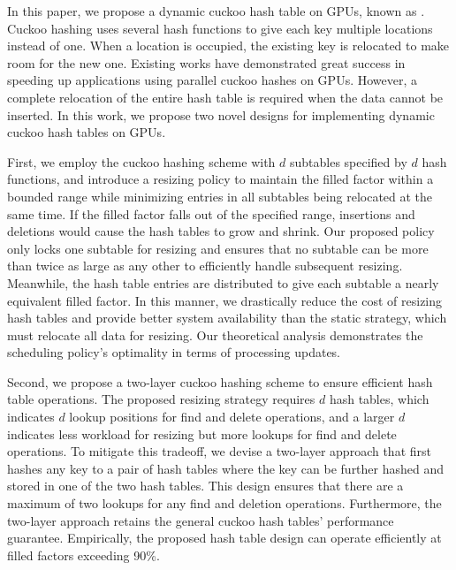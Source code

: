 In this paper, we propose a dynamic cuckoo hash table on GPUs, known as \voter. Cuckoo hashing \cite{pagh2004cuckoo} uses several hash functions to give each key multiple locations instead of one. When a location is occupied, the existing key is relocated to make room for the new one. Existing works \cite{alcantara2009real,alcantara2011building,zhang2015mega,breslow2016horton} have demonstrated great success in speeding up applications using parallel cuckoo hashes on GPUs. 
However, a complete relocation of the entire hash table is required when the data cannot be  inserted.
In this work, we propose two novel designs for implementing dynamic cuckoo hash tables on GPUs.

First, we employ the cuckoo hashing scheme with $d$ subtables specified by $d$ hash functions, and introduce a resizing policy to maintain the filled factor within a bounded range while minimizing entries in all subtables being relocated at the same time. 
If the filled factor falls out of the specified range, insertions and deletions would cause the hash tables to grow and shrink.
Our proposed policy only locks one subtable for resizing and ensures that no subtable can be more than twice as large as any other to efficiently handle subsequent resizing. Meanwhile, the hash table entries are distributed to give each subtable a nearly equivalent filled factor.
In this manner, we drastically reduce the cost of resizing hash tables and provide better system availability than the static strategy, which must relocate all data for resizing.
Our theoretical analysis demonstrates the scheduling policy's optimality in terms of processing updates. 

Second, we propose a two-layer cuckoo hashing scheme to ensure efficient hash table operations. 
The proposed resizing strategy requires $d$ hash tables, which indicates $d$ lookup positions for find and delete operations, and a larger $d$ indicates less workload for resizing but more lookups for find and delete operations. To mitigate this tradeoff, we devise a two-layer approach that first hashes any key to a pair of hash tables where the key can be further hashed and stored in one of the two hash tables.  
This design ensures that there are a maximum of two lookups for any find and deletion operations.
Furthermore, the two-layer approach retains the general cuckoo hash tables' performance guarantee.
Empirically, the proposed hash table design can operate efficiently at filled factors exceeding 90\%.

